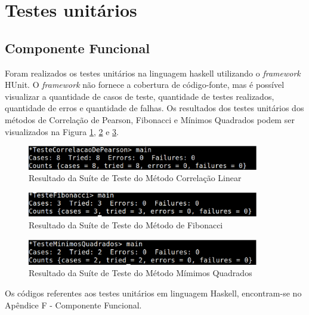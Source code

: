 \section{Testes unitários}

\subsection{Componente Funcional}

Foram realizados os testes unitários na linguagem haskell utilizando o \textit{framework} HUnit. O \textit{framework} não fornece a cobertura de código-fonte, mas é possível visualizar a quantidade de casos de teste, quantidade de testes realizados, quantidade de erros e quantidade de falhas. Os resultados dos testes unitários dos métodos de Correlação de Pearson, Fibonacci e Mínimos Quadrados podem ser visualizados na Figura \ref{testeCorrelacaoHaskell}, \ref{testeFibonacciHaskell} e \ref{TesteMinimosHaskell}.

\begin{figure}[H]
\centering
\includegraphics[width=0.9\textwidth]{figuras/testeCorrelacaoHaskell}
\caption{Resultado da Suíte de Teste do Método Correlação Linear}
\label{testeCorrelacaoHaskell}
\end{figure}

\begin{figure}[H]
\centering
\includegraphics[width=0.9\textwidth]{figuras/testeFibonacciHaskell}
\caption{Resultado da Suíte de Teste do Método de Fibonacci}
\label{testeFibonacciHaskell}
\end{figure}

\begin{figure}[H]
\centering
\includegraphics[width=0.9\textwidth]{figuras/TesteMinimosHaskell}
\caption{Resultado da Suíte de Teste do Método Mímimos Quadrados}
\label{TesteMinimosHaskell}
\end{figure}

Os códigos referentes aos testes unitários em linguagem Haskell, encontram-se no Apêndice F - Componente Funcional.

